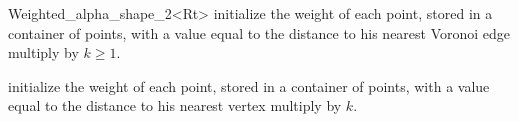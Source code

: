 \begin{ccClassTemplate} {Weighted_alpha_shape_2<Rt>}
{initialize the weight of each point, stored in a container of points, with a
value equal to the distance to his nearest Voronoi edge multiply by $k \geq 1$.}
  
{initialize the weight of each point, stored in a container of points, with a
value equal to the distance to his nearest vertex multiply by $k$.} 
 
\end{ccClassTemplate}
